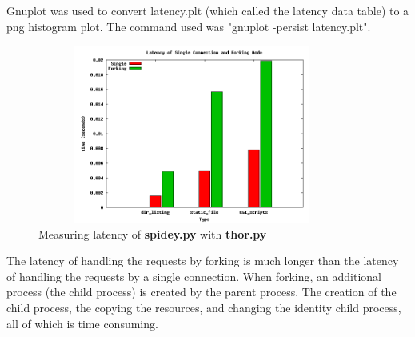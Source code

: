 \documentclass{article}
\begin{document}
\noindent Gnuplot was used to convert latency.plt (which called the latency data table) to a png histogram plot. The command used was "gnuplot -persist latency.plt".

\begin{figure}[H]
    \centering
    \includegraphics[width=4in,height=2.3in]{latency.png}
    \caption{Measuring latency of \textbf{spidey.py} with \textbf{thor.py}}
    \label{fig:my_label}
\end{figure}

\noindent The latency of handling the requests by forking is much longer than the latency of handling the requests by a single connection. When forking, an additional process (the child process) is created by the parent process. The creation of the child process, the copying the resources, and changing the identity child process, all of which is time consuming.


\end{document}
